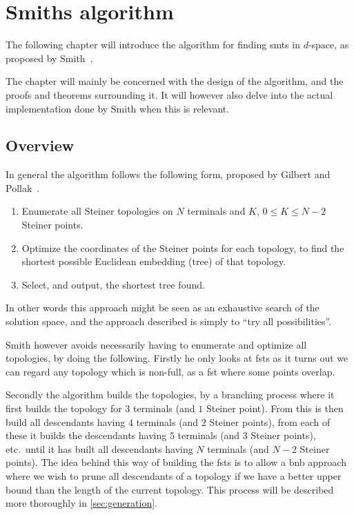 { \abnormalparskip{0pt}
\chapter{Smiths algorithm}
\label{cha:algorithm} }


The following chapter will introduce the algorithm for finding \glspl{smt} in
$d$-space, as proposed by Smith~\cite{Smith1992}.

The chapter will mainly be concerned with the design of the algorithm, and the
proofs and theorems surrounding it.  It will however also delve into the actual
implementation done by Smith when this is relevant.

\section{Overview}
\label{sec:overview}

In general the algorithm follows the following form, proposed by Gilbert and
Pollak~\cite{Gilbert1968}.

\begin{enumerate}
\item Enumerate all Steiner topologies on $N$ terminals and $K$, $0 \le K \le
N-2$ Steiner points.
\item Optimize the coordinates of the Steiner points for each topology, to find
the shortest possible Euclidean embedding (tree) of that topology.
\item Select, and output, the shortest tree found.
\end{enumerate}

In other words this approach might be seen as an exhaustive search of the
solution space, and the approach described is simply to ``try all
possibilities''.

Smith however avoids necessarily having to enumerate and optimize all
topologies, by doing the following.  Firstly he only looks at \glspl{fst} as it
turns out we can regard any topology which is non-full, as a \gls{fst} where
some points overlap.

Secondly the algorithm builds the topologies, by a branching process where it
first builds the topology for $3$ terminals (and $1$ Steiner point). From this
is then build all descendants having $4$ terminals (and $2$ Steiner points),
from each of these it builds the descendants having $5$ terminals (and $3$
Steiner points), etc.\ until it has built all descendants having $N$ terminals
(and $N-2$ Steiner points).  The idea behind this way of building the
\glspl{fst} is to allow a \gls{bnb} approach where we wish to prune all
descendants of a topology if we have a better upper bound than the length of the
current topology.  This process will be described more thoroughly in
\cref{sec:generation}.

